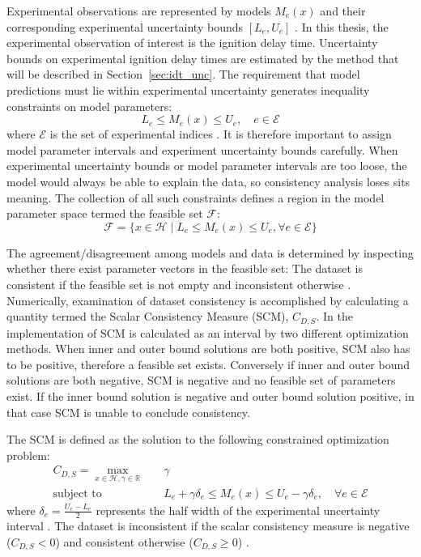 Experimental observations are represented by models $M_e(x)$ and their corresponding experimental uncertainty bounds $[L_e, U_e]$ \cite{li_development_nodate}. In this thesis, the  experimental observation of interest is the ignition delay time. Uncertainty bounds on experimental ignition delay times are estimated by the method that will be described in Section~\ref{sec:idt_unc}. The requirement that model predictions must lie within experimental uncertainty generates inequality constraints on model parameters:
\begin{equation}
	L_e \le M_e(x) \le U_e, \quad e \in \mathcal{E}
\end{equation}
\cite{li_development_nodate} where $\mathcal{E}$ is the set of experimental indices \cite{li_development_nodate}. It is therefore important to assign model parameter intervals and experiment uncertainty bounds carefully. When experimental uncertainty bounds or model parameter intervals are too loose, the model would always be able to explain the data, so consistency analysis loses sits meaning. The collection of all such constraints defines a region in the model parameter space termed the feasible set $\mathcal{F}$:
\begin{equation}
	\mathcal{F} = \{x \in \mathcal{H} \mid L_e \le M_e(x) \le U_e, \forall e \in \mathcal{E}\}
\end{equation}

The agreement/disagreement among models and data is determined by inspecting whether there exist parameter vectors in the feasible set: The dataset is consistent if the feasible set is not empty and inconsistent otherwise \cite{li_development_nodate}. Numerically, examination of dataset consistency is accomplished by calculating a quantity termed the Scalar Consistency Measure (SCM), $C_{D,S}$. In the implementation of \cite{li_development_nodate} SCM is calculated as an interval by two different optimization methods. When inner and outer bound solutions are both positive, SCM also has to be positive, therefore a feasible set exists. Conversely if inner and outer bound solutions are both negative, SCM is negative and no feasible set of parameters exist. If the inner bound solution is negative and outer bound solution positive, in that case SCM is unable to conclude consistency. 

The SCM is defined as the solution to the following constrained optimization problem:
\begin{align}
	C_{D,S} = \max_{x \in \mathcal{H}, \gamma \in \mathbb{R}} & \quad \gamma \\
	\text{subject to} & \quad L_e + \gamma \delta_e \le M_e(x) \le U_e - \gamma \delta_e, \quad \forall e \in \mathcal{E}
\end{align}
\cite{li_development_nodate} where $\delta_e = \frac{U_e - L_e}{2}$ represents the half width of the experimental uncertainty interval \cite{li_development_nodate}. The dataset is inconsistent if the scalar consistency measure is negative ($C_{D,S} < 0$) and consistent otherwise ($C_{D,S} \ge 0$) \cite{li_development_nodate}.

